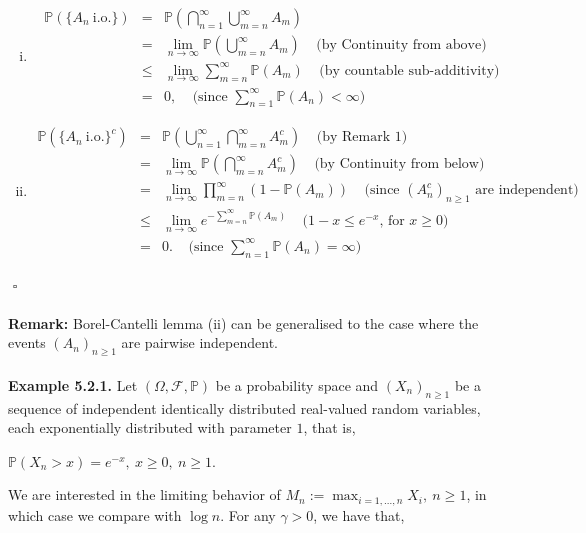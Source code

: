 \documentclass{article}
\begin{document}
\begin{enumerate}[(i)]
	\item \begin{eqnarray}
	\nonumber
	\mathbb{P}(\{A_n \ \text{i.o.}\}) &=& \mathbb{P}\left(\bigcap_{n=1}^{\infty}\bigcup_{m=n}^{\infty}A_m\right)\\
	\nonumber
	&=& \lim_{n\to\infty}\mathbb{P}\left(\bigcup_{m=n}^{\infty}A_m\right) \ \ \ \ \ \text{(by Continuity from above)}\\
	\nonumber
	&\leq& \lim_{n\to\infty}\sum_{m=n}^{\infty}\mathbb{P}(A_m) \ \ \ \ \ \text{(by countable sub-additivity)}\\
	\nonumber
	&=& 0, \ \ \ \ \ \text{(since $\sum_{n=1}^{\infty}\mathbb{P}(A_n) < \infty$)}
	\end{eqnarray}
	\item \begin{eqnarray}
	\nonumber
	\mathbb{P}(\{A_n \ \text{i.o.}\}^c) &=& \mathbb{P}\left(\bigcup_{n=1}^{\infty}\bigcap_{m=n}^{\infty}A_m^c\right) \ \ \ \ \ \text{(by Remark 1)}\\
	\nonumber
	&=& \lim_{n\to\infty}\mathbb{P}\left(\bigcap_{m=n}^{\infty}A_m^c\right) \ \ \ \ \ \text{(by Continuity from below)}\\
	\nonumber
	&=& \lim_{n\to\infty}\prod_{m=n}^{\infty}(1-\mathbb{P}(A_m)) \ \ \ \ \ \text{(since $(A_n^c)_{n \geq 1}$ are independent)}\\
	\nonumber
	&\leq& \lim_{n\to\infty} e^{-\sum_{m=n}^{\infty}\mathbb{P}(A_m)} \ \ \ \ \ \text{($1-x \leq e^{-x}$, for $x\geq0$)}\\
	\nonumber
	&=& 0. \ \ \ \ \ \text{(since $\sum_{n=1}^{\infty}\mathbb{P}(A_n) = \infty$)}
	\end{eqnarray}	
\end{enumerate}
${}$ \hfill $\square$ \\\\
\textbf{Remark:} Borel-Cantelli lemma (ii) can be generalised to the case where the events $(A_n)_{n\geq1}$ are pairwise independent.\\\\
\textbf{Example 5.2.1.} Let $(\Omega,\mathcal{F},\mathbb{P})$ be a probability space and $(X_n)_{n\geq1}$ be a sequence of independent identically distributed real-valued random variables, each exponentially distributed with parameter $1$, that is,
\begin{center}
	$\mathbb{P}(X_n > x) = e^{-x}, \ x\geq0, \ n \geq 1$.
\end{center}
We are interested in the limiting behavior of $M_n := \max_{i=1,...,n}X_i, \ n \geq 1$, in which case we compare with $\log{n}$. For any $\gamma>0$, we have that,
\end{document}

